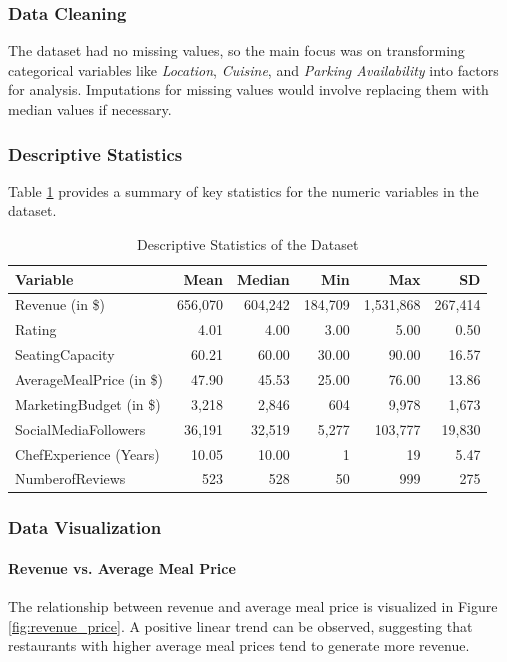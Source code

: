 \subsubsection{Data Cleaning}
The dataset had no missing values, so the main focus was on transforming categorical variables like \textit{Location}, \textit{Cuisine}, and \textit{Parking Availability} into factors for analysis. Imputations for missing values would involve replacing them with median values if necessary.

\subsubsection{Descriptive Statistics}
Table \ref{tab:descriptive} provides a summary of key statistics for the numeric variables in the dataset.

\begin{table}[H]
\centering
\caption{Descriptive Statistics of the Dataset}
\label{tab:descriptive}
\begin{tabular}{lrrrrr}
\toprule
Variable & Mean & Median & Min & Max & SD \\
\midrule
Revenue (in \$) & 656,070 & 604,242 & 184,709 & 1,531,868 & 267,414 \\
Rating & 4.01 & 4.00 & 3.00 & 5.00 & 0.50 \\
SeatingCapacity & 60.21 & 60.00 & 30.00 & 90.00 & 16.57 \\
AverageMealPrice (in \$) & 47.90 & 45.53 & 25.00 & 76.00 & 13.86 \\
MarketingBudget (in \$) & 3,218 & 2,846 & 604 & 9,978 & 1,673 \\
SocialMediaFollowers & 36,191 & 32,519 & 5,277 & 103,777 & 19,830 \\
ChefExperience (Years) & 10.05 & 10.00 & 1 & 19 & 5.47 \\
NumberofReviews & 523 & 528 & 50 & 999 & 275 \\
\bottomrule
\end{tabular}
\end{table}
\newpage
\subsubsection{Data Visualization}
\paragraph{Revenue vs. Average Meal Price}
The relationship between revenue and average meal price is visualized in Figure \ref{fig:revenue_price}. A positive linear trend can be observed, suggesting that restaurants with higher average meal prices tend to generate more revenue.

